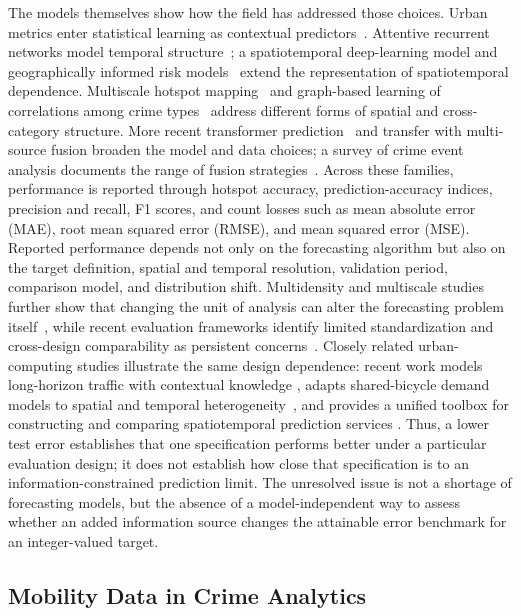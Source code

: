 \documentclass[applsci,article,accept,moreauthors]{Definitions/mdpi}
\begin{document}
{The models themselves show how the field has addressed those choices. Urban
metrics enter statistical learning as contextual predictors~\citep{alves2018crime}. Attentive recurrent networks model temporal structure~\citep{huang2018deepcrime}; a spatiotemporal deep-learning model
\citep{angbera2023model} and geographically informed risk models~\citep{deng2023risk} extend the representation of spatiotemporal dependence.
Multiscale hotspot mapping~\citep{jing2024multiscale} and graph-based learning
of correlations among crime types~\citep{wang2025mragnn} address different
forms of spatial and cross-category structure. More recent transformer
prediction~\citep{butt2025start} and transfer with multi-source fusion
\citep{cui2026transfer} broaden the model and data choices; a survey of crime
event analysis documents the range of fusion strategies~\citep{hu2023fusion}. Across these families, performance is reported through
hotspot accuracy, prediction-accuracy indices, precision and recall, F1
scores, and count losses such as mean absolute error (MAE), root mean
squared error (RMSE), and mean squared error (MSE).}
Reported performance depends not only on the forecasting
algorithm but also on the target definition, spatial and temporal resolution,
validation period, comparison model, and distribution shift. Multidensity and
multiscale studies further show that changing the unit of analysis can alter
the forecasting problem itself~\citep{cesario2024multidensity,jing2024multiscale},
while recent evaluation frameworks identify limited standardization and
cross-design comparability as persistent concerns~\citep{amarante2025steval}.
Closely related urban-computing studies illustrate the same design dependence:
recent work models long-horizon traffic with contextual knowledge
\citep{huo2025traffic}, adapts shared-bicycle demand models to spatial and
temporal heterogeneity~\citep{zhao2025bike}, and provides a unified toolbox
for constructing and comparing spatiotemporal prediction services
\citep{fang2025uctb}.
Thus, a lower test error establishes that one specification performs
better under a particular evaluation design; it does not establish how close
that specification is to an information-constrained prediction limit.
The unresolved issue is not a shortage of forecasting models, but the absence
of a model-independent way to assess whether an added information source
changes the attainable error benchmark for an integer-valued target.

\subsection{Mobility Data in Crime Analytics}
\label{subsec:related_mobility_crime}
\end{document}

